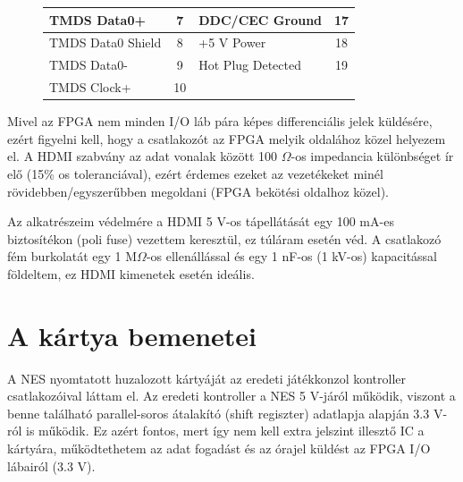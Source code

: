 \begin{figure}[H]
\begin{minipage}[]{\textwidth}
\begin{minipage}[b]{0.59\textwidth}
\begin{tabular}{|l|c|l|c|}
				TMDS Data0+       & 7                                                                                & DDC/CEC Ground    & 17                                                                               \\ \hline
				TMDS Data0 Shield & 8                                                                                & +5 V Power        & 18                                                                               \\ \hline
				TMDS Data0-       & 9                                                                                & Hot Plug Detected & 19                                                                               \\ \hline
				TMDS Clock+       & 10                                                                               &                   & \multicolumn{1}{l|}{}                                                            \\ \hline
			\end{tabular}
			\label{tab:HDMI-pinout}
		\end{minipage}
	\end{minipage}
	\end{figure} 
	
	Mivel az FPGA nem minden I/O láb pára képes differenciális jelek küldésére, ezért figyelni kell, hogy a csatlakozót az FPGA melyik oldalához közel helyezem el. A HDMI szabvány az adat vonalak között 100 $\Omega$-os impedancia különbséget ír elő (15\% os toleranciával), ezért érdemes ezeket az vezetékeket minél rövidebben/egyszerűbben megoldani (FPGA bekötési oldalhoz közel). 
	
	Az alkatrészeim védelmére a HDMI 5 V-os tápellátását egy 100 mA-es biztosítékon (poli fuse) vezettem keresztül, ez túláram esetén véd. A csatlakozó fém burkolatát egy 1 M$\Omega$-os ellenállással és egy 1 nF-os (1 kV-os) kapacitással földeltem, ez HDMI kimenetek esetén ideális. 
	
\section{A kártya bemenetei}
	
	A NES nyomtatott huzalozott kártyáját az eredeti játékkonzol kontroller csatlakozóival láttam el. Az eredeti kontroller a NES 5 V-járól működik, viszont a benne található parallel-soros átalakító (shift regiszter) adatlapja alapján 3.3 V-ról is működik. Ez azért fontos, mert így nem kell extra jelszint illesztő IC a kártyára, működtethetem az adat fogadást és az órajel küldést az FPGA I/O lábairól (3.3 V).
	
